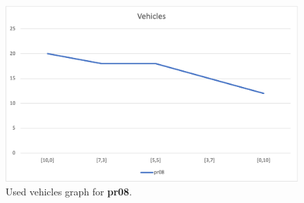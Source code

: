\begin{figure}[H]
    \centering
    \includegraphics[height=0.25\textheight]{../graphs/pr08-vehicles.png}
    \caption{Used vehicles graph for \textbf{pr08}.}
\end{figure}

\newpage
